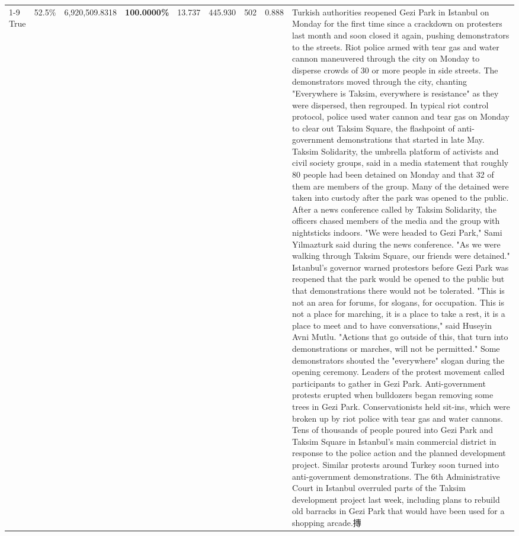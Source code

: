 \begin{table}[H]
\begin{tabular}{lllrlllll}
\cline{1-9}
True & 52.5\% & 6,920,509.8318 & \bfseries \color{red} 100.0000\% & 13.737 & 445.930 & 502 & 0.888 & Turkish authorities reopened Gezi Park in Istanbul on Monday for the first time since a crackdown on protesters last month and soon closed it again, pushing demonstrators to the streets. Riot police armed with tear gas and water cannon maneuvered through the city on Monday to disperse crowds of 30 or more people in side streets. The demonstrators moved through the city, chanting "Everywhere is Taksim, everywhere is resistance" as they were dispersed, then regrouped. In typical riot control protocol, police used water cannon and tear gas on Monday to clear out Taksim Square, the flashpoint of anti-government demonstrations that started in late May. Taksim Solidarity, the umbrella platform of activists and civil society groups, said in a media statement that roughly 80 people had been detained on Monday and that 32 of them are members of the group. Many of the detained were taken into custody after the park was opened to the public. After a news conference called by Taksim Solidarity, the officers chased members of the media and the group with nightsticks indoors. "We were headed to Gezi Park," Sami Yilmazturk said during the news conference. "As we were walking through Taksim Square, our friends were detained." Istanbul's governor warned protestors before Gezi Park was reopened that the park would be opened to the public but that demonstrations there would not be tolerated. "This is not an area for forums, for slogans, for occupation. This is not a place for marching, it is a place to take a rest, it is a place to meet and to have conversations," said Huseyin Avni Mutlu. "Actions that go outside of this, that turn into demonstrations or marches, will not be permitted." Some demonstrators shouted the "everywhere" slogan during the opening ceremony. Leaders of the protest movement called participants to gather in Gezi Park. Anti-government protests erupted when bulldozers began removing some trees in Gezi Park. Conservationists held sit-ins, which were broken up by riot police with tear gas and water cannons. Tens of thousands of people poured into Gezi Park and Taksim Square in Istanbul's main commercial district in response to the police action and the planned development project. Similar protests around Turkey soon turned into anti-government demonstrations. The 6th Administrative Court in Istanbul overruled parts of the Taksim development project last week, including plans to rebuild old barracks in Gezi Park that would have been used for a shopping arcade.摶 \\

\end{tabular}
\end{table}
